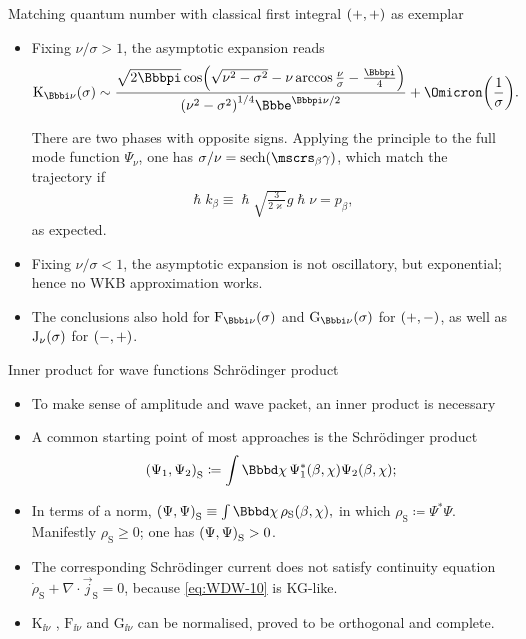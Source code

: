 \documentclass[9pt]{beamer}
\begin{document}
\begin{frame}%
{Matching quantum number with classical first integral}%
{${\left(+,+\right)}$ as exemplar}
\begin{itemize}
\item Fixing $\nu/\sigma>1$, the asymptotic expansion
reads
\begin{align}
\rfun{\mathrm{K}_{\ii \nu}}{\sigma} \sim
\frac{\sqrt{2\pp}\,
\rfun{\cos}{\sqrt{\nu^2-\sigma^2}-\nu\arccos\frac{\nu}{\sigma}-\frac{\pp}{4}}
}{
\rbr{\nu^2-\sigma^2}^{1/4}\ee^{\pp\nu/2}}
+\rfun{\Omicron}{\frac{1}{\sigma}}.
\end{align}

There are two phases with opposite signs. %
Applying the principle to the full mode function $\Psi_\nu$, one has
$\sigma/\nu = \rfun{\sech}{\mscrs_\beta\gamma}$, which match the trajectory if
\begin{align}
\hslash k_\beta \equiv \hslash \sqrt{\frac{3}{2\varkappa}}g\hslash\nu
= p_\beta,
\end{align}
as expected.

\item Fixing $\nu/\sigma<1$, the asymptotic expansion is not oscillatory,
but exponential; hence no WKB approximation works.

\item The conclusions also hold for $\rfun{\mathrm{F}_{\ii\nu}}{\sigma}$
and $\rfun{\mathrm{G}_{\ii\nu}}{\sigma}$ for ${\left(+,-\right)}$, as well as 
${\mathrm{J}_{\nu}}\mathopen{}\left(\sigma\right)\mathclose{}$ for ${\left(-,+\right)}$.
\end{itemize}
\end{frame}

\begin{frame}%
{Inner product for wave functions}%
{Schrödinger product}
\begin{itemize}
\item To make sense of amplitude and wave packet, an inner product is necessary

\item A common starting point of most approaches is the \alert{Schrödinger 
product}
\begin{align}
\rbr{\Psi_1,\Psi_2}_\text{S} \coloneqq
\int \dd \chi\,\rfun{\Psi_1^*}{\beta,\chi} \rfun{\Psi_2}{\beta,\chi};
\end{align}

\item In terms of a norm, $\rbr{\Psi, \Psi}_\text{S} \equiv \int \dd \chi\,
\rfun{\rho_\text{S}}{\beta,\chi},$ in which $\rho_\text{S} \coloneqq 
\Psi^*\Psi$. Manifestly $\rho_\text{S} \ge 0$; one has ${\left(\Psi, 
\Psi\right)}_\text{S} > 0$.

\item
The corresponding Schrödinger current does not satisfy continuity equation
$\dot{\rho}_\text{S} + \nabla\cdot \vec{j}_\text{S} = 0$, because 
\cref{eq:WDW-10} is KG-like.
\item $\mathrm{K}_{\ii\nu}$%
, 
$\mathrm{F}_{\ii\nu}$ and $\mathrm{G}_{\ii\nu}$ can be normalised, proved to be 
orthogonal and complete.
\end{itemize}
\end{frame}
\end{document}
